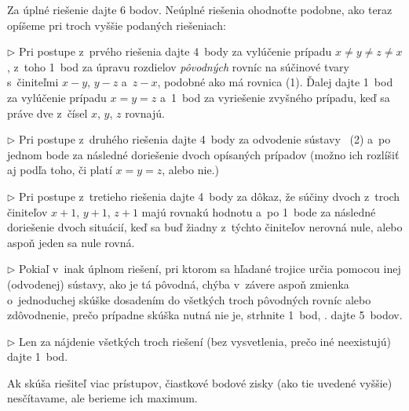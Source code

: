 {\nobreak\medskip\petit
\noindent
Za úplné riešenie dajte 6 bodov. Neúplné riešenia ohodnoťte podobne, ako
teraz opíšeme pri troch vyššie podaných riešeniach:
\item{$\triangleright$}
Pri postupe z~prvého riešenia dajte 4~body za vylúčenie prípadu
$x\ne y\ne z\ne x$, z~toho 1~bod za úpravu rozdielov {\it
pôvodných\/} rovníc na súčinové tvary s~činiteľmi $x-y$, $y-z$
a~$z-x$, podobné ako má rovnica (1). Ďalej dajte 1~bod za vylúčenie prípadu
$x=y=z$ a~1~bod za vyriešenie zvyšného prípadu, keď sa práve dve
z~čísel $x$, $y$, $z$ rovnajú.
\item{$\triangleright$} Pri postupe z~druhého riešenia dajte 4~body za odvodenie sústavy~
(2) a~po jednom bode za následné doriešenie dvoch opísaných prípadov
(možno ich rozlíšiť aj podľa toho, či platí $x=y=z$, alebo nie.)
\item{$\triangleright$} Pri postupe z~tretieho riešenia dajte 4~body za dôkaz, že súčiny dvoch z~troch činiteľov $x+1$, $y+1$, $z+1$ majú rovnakú hodnotu a~po 1~bode za následné doriešenie dvoch situácií, keď sa buď žiadny z~týchto činiteľov
nerovná nule, alebo aspoň jeden sa nule rovná.
\item{$\triangleright$} Pokiaľ v~inak úplnom riešení, pri ktorom sa hľadané trojice určia pomocou
inej (odvodenej) sústavy, ako je tá pôvodná, chýba v~závere aspoň
zmienka o~jednoduchej skúške dosadením do všetkých troch pôvodných rovníc alebo zdôvodnenie,
prečo prípadne skúška nutná nie je, strhnite 1~bod, \tj. dajte 5~bodov.
\item{$\triangleright$} Len za nájdenie všetkých troch riešení (bez vysvetlenia, prečo iné
neexistujú) dajte 1~bod.

\noindent
Ak skúša riešiteľ viac prístupov, čiastkové bodové zisky (ako tie uvedené
vyššie) nesčítavame, ale berieme ich maximum.
\endpetit
}

